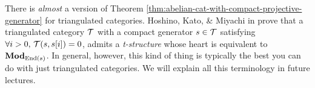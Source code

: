 \begin{remark}
	There is \emph{almost} a version of Theorem \ref{thm:abelian-cat-with-compact-projective-generator} for triangulated categories. Hoshino, Kato, \& Miyachi in \cite{hkm02} prove that a triangulated category \(\mathcal{T}\) with a compact generator
	\(s\in\mathcal{T}\) satisfying \(\forall i>0,\,\mathcal{T}(s,s[i]) = 0\), admits a \emph{t-structure} whose heart is equivalent to \(\mathbf{Mod}_{\operatorname{End}(s)}\). In general, however, this kind of thing
	is typically the best you can do with just triangulated categories. We will explain all this terminology in future lectures.
\end{remark}
